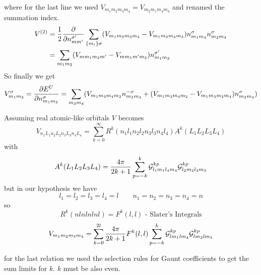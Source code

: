 where for the last line we used $V_{m_1m_2m_3m_4}=V_{m_2m_1m_4m_3}$ and renamed the summation index.\\
\begin{equation}
\begin{split}
V^{(2)}&=\frac{1}{2}\frac{\partial }{\partial n_{mm^\prime}^{\sigma^\prime}}\sum_{\{m_i\}\sigma}(V_{m_1m_2m_3m_4}-V_{m_1m_2m_4m_3})
n_{m_1m_4}^{\sigma}n_{m_2m_3}^{\sigma}\\
&=\sum_{m_1m_2}(V_{mm_1m_2m^{\prime}}-V_{mm_1m^{\prime}m_2})n_{m_1m_2}^{\sigma^\prime}
\end{split}
\end{equation}
So finally we get
\begin{equation}
V_{m_1m_2}^{\sigma}=\frac{\partial E^U}{\partial n_{m_1m_2}^{\sigma}}=\sum_{m_3m_4}(V_{m_1m_3m_4m_2}
n_{m_3m_4}^{-\sigma}+(V_{m_1m_3m_4m_2}-V_{m_1m_3m_2m_4})n_{m_3m_4}^{\sigma})
\end{equation}
%
\par{Assuming real atomic-like orbitals $V$ becomes}
\begin{equation}
V_{n_1L_1n_2L_2n_3L_3n_4L_4}=\sum_{k=0}^{\infty}R^k(n_1l_1n_2l_2n_3l_3n_4l_4)A^k(L_1L_2L_3L_4)
\end{equation}
with
\begin{equation*}
A^k(L_1L_2L_3L_4)=\frac{4\pi}{2k+1}\sum_{p=-k}^{k}\mathcal{G}_{l_1m_1l_4m_4}^{kp}\mathcal{G}_{l_2m_2l_3m_3}^{kp}
\end{equation*}
but in our hypothesis we have
\begin{equation*}
l_1=l_2=l_3=l_4=l\qquad n_1=n_2=n_3=n_4=n
\end{equation*}
so 
\begin{equation*}
R^{k}(nlnlnlnl)=F^k(l,l)\text{ - Slater's Integrals}
\end{equation*}
\begin{equation}
V_{m_1m_2m_3m_4}=\sum_{k=0}^{2l}\frac{4\pi}{2k+1}F^k(l,l)\sum_{p=-k}^{k}\mathcal{G}_{lm_1lm_4}^{kp}\mathcal{G}_{lm_2lm_3}^{kp}
\end{equation}
\par{for the last relation we used the selection rules for Gaunt coefficients to get the sum limits for $k$.
$k$ must be also even.}
%
